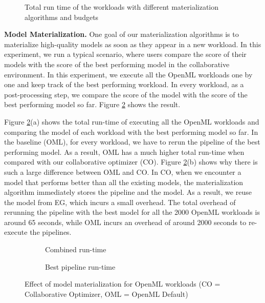 \begin{figure}
\centering
 \resizebox{0.5\columnwidth}{!}{%
%
}
\caption{Total run time of the workloads with different materialization algorithms and budgets }
\label{run-time-vs-mat}
\end{figure}

\textbf{Model Materialization. }
One goal of our materialization algorithms is to materialize high-quality models as soon as they appear in a new workload.
In this experiment, we run a typical scenario, where users compare the score of their models with the score of the best performing model in the collaborative environment.
In this experiment, we execute all the OpenML workloads one by one and keep track of the best performing workload.
In every workload, as a post-processing step, we compare the score of the model with the score of the best performing model so far.
Figure \ref{exp-model-materialization} shows the result.

Figure \ref{exp-model-materialization}(a) shows the total run-time of executing all the OpenML workloads and comparing the model of each workload with the best performing model so far.
In the baseline (OML), for every workload, we have to rerun the pipeline of the best performing model.
As a result, OML has a much higher total run-time when compared with our collaborative optimizer (CO).
Figure \ref{exp-model-materialization}(b) shows why there is such a large difference between OML and CO.
In CO, when we encounter a model that performs better than all the existing models, the materialization algorithm immediately stores the pipeline and the model.
As a result, we reuse the model from EG, which incurs a small overhead.
The total overhead of rerunning the pipeline with the best model for all the 2000 OpenML workloads is around 65 seconds, while OML incurs an overhead of around 2000 seconds to re-execute the pipelines.

\begin{figure}
\begin{subfigure}[b]{0.5\linewidth}
\centering
 \resizebox{\columnwidth}{!}{%
%
}
\caption{Combined run-time}
\end{subfigure}%
\begin{subfigure}[b]{0.5\linewidth}
\centering
 \resizebox{\columnwidth}{!}{%
%
}
\caption{Best pipeline run-time}
\end{subfigure}
\caption{Effect of model materialization for OpenML workloads (CO = Collaborative Optimizer, OML = OpenML Default)}
\label{exp-model-materialization}
\end{figure}


